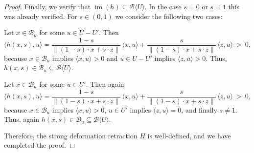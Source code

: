 \documentclass[10pt,a4paper]{amsart}
\DeclareMathOperator{\im}{\mathrm{im}}
\begin{document}
\begin{proof}
	\medskip
	Finally, we verify that $\im(h)\subseteq \mathscr{B}\langle U\rangle$.
	In the case $s=0$ or $s=1$ this was already verified.
	For $s\in (0,1)$ we consider the following two cases:
	\begin{compactenum}[\rm\qquad (a)]

		\item Let $x\in \mathscr{B}_u$ for some $u\in U-U'$. Then
		\[
			\langle h(x,s),u\rangle=
			\frac{1-s}{\| (1-s)\cdot x+s\cdot z\|}\,\langle x,u\rangle+
			\frac{s}{\| (1-s)\cdot x+s\cdot z\|}\,\langle z,u\rangle \ > \ 0,
		\]
		because $x\in \mathscr{B}_u$ implies $\langle x,u\rangle> 0$ and $u\in U-U'$ implies $\langle z,u\rangle> 0$.
		Thus, $h(x,s)\in \mathscr{B}_u\subseteq \mathscr{B}\langle U\rangle$.

		\item Let $x\in \mathscr{B}_u$ for some $u\in U'$. Then again
		\[
			\langle h(x,s),u\rangle=
			\frac{1-s}{\| (1-s)\cdot x+s\cdot z\|}\,\langle x,u\rangle+
			\frac{s}{\| (1-s)\cdot x+s\cdot z\|}\,\langle z,u\rangle \ > \ 0,
		\]
		because $x\in \mathscr{B}_u$ implies $\langle x,u\rangle> 0$, $u\in U'$ implies $\langle z,u\rangle= 0$, and finally $s\neq 1$.
		Thus, again $h(x,s)\in \mathscr{B}_u\subseteq \mathscr{B}\langle U\rangle$.
	\end{compactenum}


	\medskip
	Therefore, the strong deformation retraction $H$ is well-defined, and we have completed the proof.
\end{proof}
\end{document}
